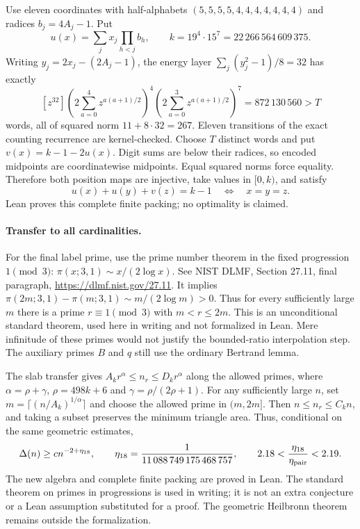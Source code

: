\documentclass[11pt]{article}
\begin{document}
Use eleven coordinates with half-alphabets
$(5,5,5,5,4,4,4,4,4,4,4)$ and radices $b_j=4A_j-1$. Put
\[
 u(x)=\sum_jx_j\prod_{h<j}b_h,\qquad
 k=19^4\cdot15^7=22\,266\,564\,609\,375.
\]
Writing $y_j=2x_j-(2A_j-1)$, the energy layer
$\sum_j(y_j^2-1)/8=32$ has exactly
\[
 [z^{32}]\left(2\sum_{a=0}^4z^{a(a+1)/2}\right)^4
 \left(2\sum_{a=0}^3z^{a(a+1)/2}\right)^7
 =872\,130\,560>T
\]
words, all of squared norm $11+8\cdot32=267$.
Eleven transitions of the exact counting recurrence are kernel-checked.
Choose $T$ distinct words and put $v(x)=k-1-2u(x)$. Digit sums are
below their radices, so encoded midpoints are coordinatewise midpoints.
Equal squared norms force equality. Therefore both position maps are
injective, take values in $[0,k)$, and satisfy
\[
 u(x)+u(y)+v(z)=k-1\quad\Longleftrightarrow\quad x=y=z.
\]
Lean proves this complete finite packing; no optimality is claimed.


\paragraph{Transfer to all cardinalities.}
For the final label prime, use the prime number theorem in the
fixed progression $1\pmod3$: $\pi(x;3,1)\sim x/(2\log x)$.
See NIST DLMF, Section 27.11, final paragraph,
\url{https://dlmf.nist.gov/27.11}.
It implies $\pi(2m;3,1)-\pi(m;3,1)\sim m/(2\log m)>0$.
Thus for every sufficiently large $m$ there is a prime $r\equiv1\pmod3$
with $m<r\le2m$. This is an unconditional standard theorem, used here
in writing and not formalized in Lean. Mere infinitude of these primes
would not justify the bounded-ratio interpolation step.
The auxiliary primes $B$ and $q$ still use the ordinary Bertrand lemma.

The slab transfer gives $A_kr^\alpha\le n_r\le D_kr^\alpha$ along
the allowed primes, where $\alpha=\rho+\gamma$, $\rho=498k+6$ and
$\gamma=\rho/(2\rho+1)$. For any sufficiently large $n$, set
$m=\lceil(n/A_k)^{1/\alpha}\rceil$ and choose the allowed prime in
$(m,2m]$. Then $n\le n_r\le C_kn$, and taking a subset preserves
the minimum triangle area. Thus, conditional on the same geometric
estimates,
\[
 \Delta(n)\ge c n^{-2+\eta_{18}},\qquad
 \eta_{18}=\frac1{11\,088\,749\,175\,468\,757},\qquad
 2.18<\frac{\eta_{18}}{\eta_{\rm pair}}<2.19.
\]
The new algebra and complete finite packing are proved in Lean.
The standard theorem on primes in progressions is used in writing;
it is not an extra conjecture or a Lean assumption substituted for a proof.
The geometric Heilbronn theorem remains outside the formalization.
\end{document}
